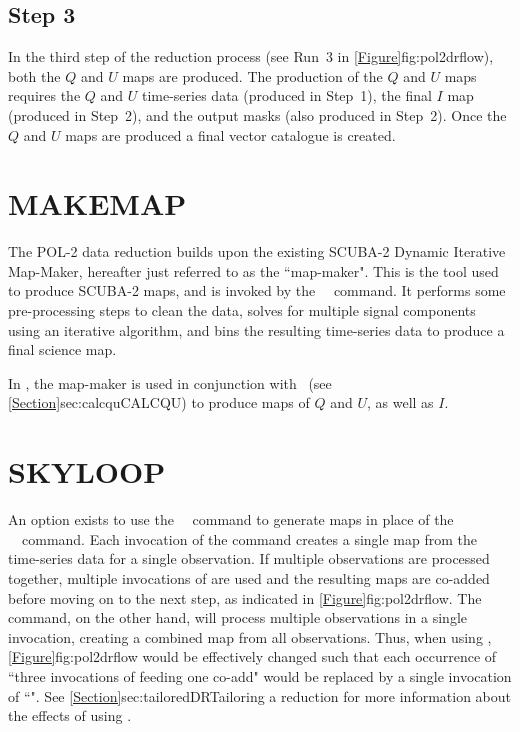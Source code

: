 \subsection*{Step 3}

In the third step of the reduction process (see Run~3 in
\cref{Figure}{fig:pol2drflow}{}), both the $Q$ and $U$ maps are produced. The production
of the $Q$ and $U$ maps requires the $Q$ and $U$ time-series data (produced in
Step~1), the final $I$ map (produced in Step~2), and the output masks (also
produced in Step~2). Once the $Q$ and $U$ maps are produced a final vector
catalogue is created.

\section{MAKEMAP}

The POL-2 data reduction builds upon the existing SCUBA-2 Dynamic
Iterative Map-Maker, hereafter just referred to as the ``map-maker". This
is the tool used to produce SCUBA-2 maps, and is invoked by the
\SMURF\ \makemap\ command. It performs some
pre-processing steps to clean the data, solves for multiple signal
components using an iterative algorithm, and bins the resulting
time-series data to produce a final science map.

In \poltwomap, the map-maker is used in conjunction with \calcqu\ (see
\cref{Section}{sec:calcqu}{CALCQU}) to produce maps of $Q$ and $U$, as well as $I$.

\section{SKYLOOP}
\label{sec:skyloop}

An option exists to use the \SMURF\ \skyloop\  command to generate maps
in place of the \SMURF\ \makemap\ command. Each invocation of the
 command creates a single map from the time-series data
for a single observation. If multiple observations are processed together,
multiple invocations of  are used and the resulting maps are
co-added before moving on to the next step, as indicated in
\cref{Figure}{fig:pol2drflow}{}. The  command, on the other hand,
will process multiple observations in a single invocation, creating a combined
map from all observations. Thus, when using ,
\cref{Figure}{fig:pol2drflow}{} would be effectively changed such that each occurrence
of ``three invocations of  feeding one co-add" would be replaced
by a single invocation of ``". See
\cref{Section}{sec:tailoredDR}{Tailoring a reduction}
for more information about the effects of using .

